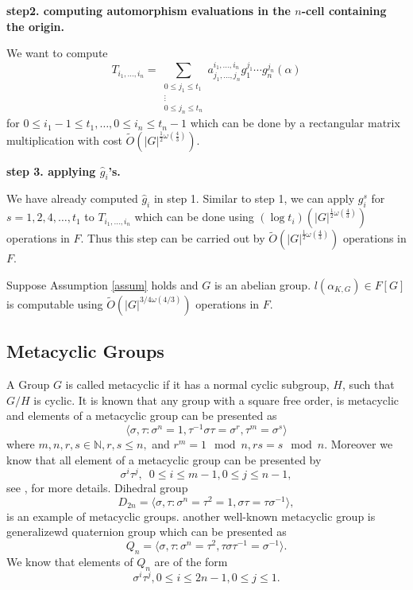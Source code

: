 \documentclass[sigconf]{acmart}
\newcommand{\osum}[2]{\alpha_{#1,#2}}
\newcommand{\thecost}{\tilde{O}(\vert G \vert ^{3/4 \omega(4/3)})}
\theoremstyle{acmplain}
\begin{document}
\textbf{step2. computing automorphism evaluations in the $n$-cell containing the origin.}

We want to compute
$$T_{i_1, \ldots, i_n} = \sum_{\substack{0 \leq j_1 \leq t_1\\ \vdots \\ 0 \leq j_n \leq t_n}} a^{i_1, \ldots , i_n}_{j_1, \ldots , j_n}g_1^{j_1}\cdots g_n^{j_n}(\alpha)$$
for $0 \leq i_1-1 \leq t_1, \ldots , 0 \leq i_n \leq t_n-1$ which can be done by a rectangular matrix multiplication with cost
$\tilde{O}(\vert G \vert ^{\frac{1}{2}\omega(\frac{4}{3})})$.

\textbf{step 3. applying $\hat{g}_i$'s.}

We have already computed $\hat{g}_i$ in step 1. Similar to step 1, we can apply $g_i^s$ 
for $s = 1, 2, 4 , \ldots, t_1$ to $T_{i_1, \ldots , i_n}$ which can be done using $(\log t_i)(\vert G \vert^{\frac{1}{2}\omega
(\frac{4}{3})})$ operations in $F$. Thus this step can be carried out by $\tilde{O}(\vert G \vert^{\frac{1}{2}\omega
(\frac{4}{3})})$ operations in $F$. 

\begin{proposition}
Suppose Assumption \ref{assum} holds and $G$ is an abelian group. $l(\osum{K}{G}) \in F[G]$ is computable using $\thecost$ 
operations in $F$.
\end{proposition}

\subsection{Metacyclic Groups}

A Group $G$ is called metacyclic if it has a normal cyclic subgroup, $H$, such that $G/H$ is cyclic. It is known that any group
with a square free order, is metacyclic and elements of a metacyclic group can be presented as 
\begin{equation}\label{eq:metacyclic}
\langle \sigma,\tau: \sigma^n = 1, \tau^{-1}\sigma \tau = \sigma^r, \tau ^m = \sigma^s \rangle
\end{equation}
where $m,n,r,s \in \mathbb{N}, r,s \leq n,$ and $r^m = 1 \mod n , rs = s \mod n$. Moreover we know that all element of a metacyclic
 group can be presented by $$\sigma^i \tau^j, \,\,\, 0\leq i \leq m-1, 0\leq j \leq n-1,$$ 
see \cite[P.88, Proposition 1]{Johnson}, \cite[P.334]{Curtis} for more details. Dihedral group 
$$D_{2n} = \langle \sigma,\tau: \sigma^n =\tau^2 = 1, \sigma \tau = \tau \sigma^{-1} \rangle, $$
is an example of metacyclic groups. another well-known metacyclic group is generalizewd quaternion
 group which can be presented as
 $$Q_n = \langle \sigma,\tau: \sigma^n =\tau^2, \tau \sigma \tau^{-1} = \sigma^{-1} \rangle.$$
 We know that elements of $Q_n$ are of the form 
 $$\sigma^i\tau^j, 0 \leq i \leq 2n-1 , 0\leq j \leq 1.$$
 
\end{document}
